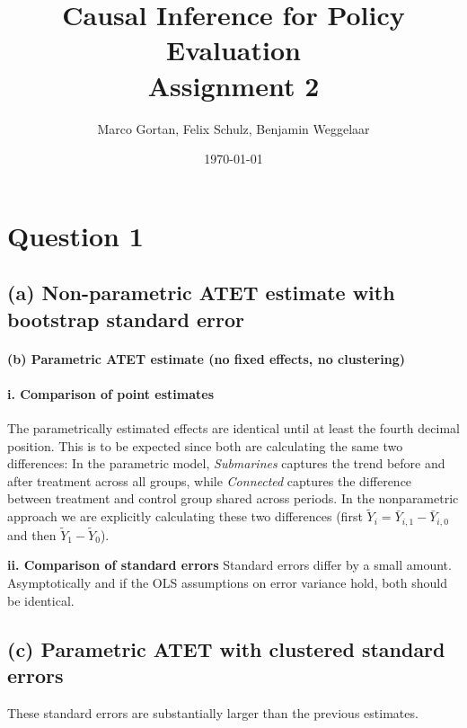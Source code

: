\documentclass{scrartcl}
\title{Causal Inference for Policy Evaluation\\
\Large{Assignment 2}}
\author{Marco Gortan, Felix Schulz, Benjamin Weggelaar}
\date{\today}
\begin{document}
\maketitle

\section*{Question 1}

\subsection*{(a) Non-parametric ATET estimate with bootstrap standard error}



\paragraph*{(b) Parametric ATET estimate (no fixed effects, no clustering)}



\paragraph*{i. Comparison of point estimates}

The parametrically estimated effects are identical until at least the fourth decimal position. This is to be expected since both are calculating the same two differences: In the parametric model, \textit{Submarines} captures the trend before and after treatment across all groups, while \textit{Connected} captures the difference between treatment and control group shared across periods. In the nonparametric approach we are explicitly calculating these two differences (first $\tilde{Y}_i = \bar{Y}_{i,1} - \bar{Y}_{i,0}$ and then $\tilde{Y}_1 - \tilde{Y}_0$).

\textbf{ii. Comparison of standard errors} Standard errors differ by a small amount. Asymptotically and if the OLS assumptions on error variance hold, both should be identical.


\subsection*{(c) Parametric ATET with clustered standard errors}

These standard errors are substantially larger than the previous estimates.
\end{document}
